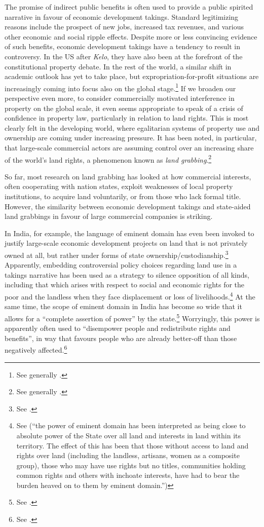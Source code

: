 The promise of indirect public benefits is often used to provide a public spirited narrative in favour of economic development takings. Standard legitimizing reasons include the prospect of new jobs, increased tax revenues, and various other economic and social ripple effects. Despite more or less convincing evidence of such benefits, economic development takings have a tendency to result in controversy. In the US after {\it Kelo}, they have also been at the forefront of the constitutional property debate. In the rest of the world, a similar shift in academic outlook has yet to take place, but expropriation-for-profit situations are increasingly coming into focus also on the global stage.\footnote{See generally \cite{waring13,verstappen14,gray11}.} If we broaden our perspective even more, to consider commercially motivated interference in property on the global scale, it even seems appropriate to speak of a crisis of confidence in property law, particularly in relation to land rights. This is most clearly felt in the developing world, where egalitarian systems of property use and ownership are coming under increasing pressure. It has been noted, in particular, that large-scale commercial actors are assuming control over an increasing share of the world's land rights, a phenomenon known as {\it land grabbing}.\footnote{See generally \cite{borras11}.}

So far, most research on land grabbing has looked at how commercial interests, often cooperating with nation states, exploit weaknesses of local property institutions, to acquire land voluntarily, or from those who lack formal title. However, the similarity between economic development takings and state-aided land grabbings in favour of large commercial companies is striking. 

In India, for example, the language of eminent domain has even been invoked to justify large-scale economic development projects on land that is not privately owned at all, but rather under forms of state ownership/custodianship.\footnote{See \cite[141]{mehta09}.} Apparently, embedding controversial policy choices regarding land use in a takings narrative has been used as a strategy to silence opposition of all kinds, including that which arises with respect to social and economic rights for the poor and the landless when they face displacement or loss of livelihoods.\footnote{See \cite[143-144]{mehta09} (``the power of eminent domain has been interpreted as being close to absolute power of the State over all land and interests in land within its territory. The effect of this has been that those without access to land and rights over land (including the landless, artisans, women as a composite group), those who may have use rights but no titles, communities holding common rights and others with inchoate interests, have had to bear the burden heaved on to them by eminent domain.'')} At the same time, the scope of eminent domain in India has become so wide that it allows for a ``complete assertion of power'' by the state.\footnote{See \cite[43]{cullet09}.} Worryingly, this power is apparently often used to ``disempower people and redistribute rights and benefits'', in way that favours people who are already better-off than those negatively affected.\footnote{See \cite[33]{cullet09}.}

